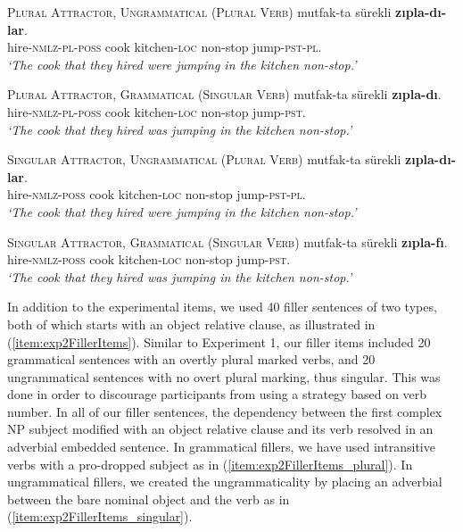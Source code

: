 \documentclass[
  english,
  doc,floatsintext]{apa6}
\begin{document}
\begin{exe}
\ex \label{item:exp2ExperimentalItems}
\begin{xlist}

\ex \textsc{Plural Attractor, Ungrammatical (Plural Verb)}\label{item:exp2expitem-plpl}
   mutfak-ta sürekli \textbf{zıpla-dı-lar}.\\ 
  hire-\textsc{nmlz}-\textsc{pl}-\textsc{poss}  cook kitchen-\textsc{loc} non-stop  jump-\textsc{pst}-\textsc{pl}.\\
  \glt \textit{`The cook that they hired were jumping in the kitchen non-stop.'}

\ex \textsc{Plural Attractor, Grammatical (Singular Verb)}\label{item:exp2expitem-plsg}
   mutfak-ta sürekli \textbf{zıpla-dı}.\\ 
  hire-\textsc{nmlz}-\textsc{pl}-\textsc{poss}  cook kitchen-\textsc{loc} non-stop  jump-\textsc{pst}.\\
  \glt \textit{`The cook that they hired was jumping in the kitchen non-stop.'}

\ex \textsc{Singular Attractor, Ungrammatical (Plural Verb)}\label{item:exp2expitem-sgpl}
   mutfak-ta sürekli \textbf{zıpla-dı-lar}.\\ 
  hire-\textsc{nmlz}-\textsc{poss}  cook kitchen-\textsc{loc} non-stop  jump-\textsc{pst}-\textsc{pl}.\\
  \glt \textit{`The cook that they hired were jumping in the kitchen non-stop.'}

\ex \textsc{Singular Attractor, Grammatical (Singular Verb)}\label{item:exp2expitem-sgsg}
   mutfak-ta sürekli \textbf{zıpla-fı}.\\ 
  hire-\textsc{nmlz}-\textsc{poss}  cook kitchen-\textsc{loc} non-stop  jump-\textsc{pst}.\\
  \glt \textit{`The cook that they hired was jumping in the kitchen non-stop.'}
\end{xlist}
\end{exe}

In addition to the experimental items, we used 40 filler sentences of two types, both of which starts with an object relative clause, as illustrated in (\ref{item:exp2FillerItems}). Similar to Experiment 1, our filler items included 20 grammatical sentences with an overtly plural marked verbs, and 20 ungrammatical sentences with no overt plural marking, thus singular.
This was done in order to discourage participants from using a strategy based on verb number.
In all of our filler sentences, the dependency between the first complex NP subject modified with an object relative clause and its verb resolved in an adverbial embedded sentence.
In grammatical fillers, we have used intransitive verbs with a pro-dropped subject as in (\ref{item:exp2FillerItems_plural}).
In ungrammatical fillers, we created the ungrammaticality by placing an adverbial between the bare nominal object and the verb as in (\ref{item:exp2FillerItems_singular}).
\end{document}
